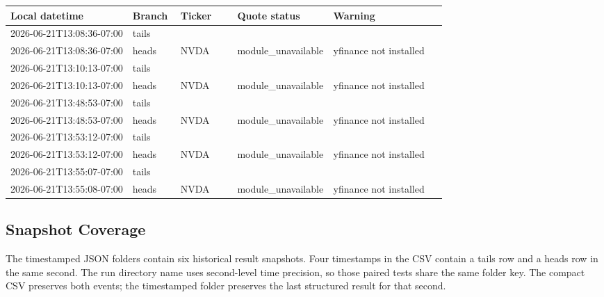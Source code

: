 \documentclass[11pt,a4paper]{article}
\newcommand{\tighttable}{\renewcommand{\arraystretch}{1.16}\small}
\begin{document}
\tighttable
\begin{tabularx}{\linewidth}{@{}p{0.28\linewidth}p{0.11\linewidth}p{0.13\linewidth}p{0.22\linewidth}X@{}}
\toprule
Local datetime & Branch & Ticker & Quote status & Warning \\
\midrule
2026-06-21T13:08:36-07:00 & tails & & & \\
2026-06-21T13:08:36-07:00 & heads & NVDA & module\_unavailable & yfinance not installed \\
2026-06-21T13:10:13-07:00 & tails & & & \\
2026-06-21T13:10:13-07:00 & heads & NVDA & module\_unavailable & yfinance not installed \\
2026-06-21T13:48:53-07:00 & tails & & & \\
2026-06-21T13:48:53-07:00 & heads & NVDA & module\_unavailable & yfinance not installed \\
2026-06-21T13:53:12-07:00 & tails & & & \\
2026-06-21T13:53:12-07:00 & heads & NVDA & module\_unavailable & yfinance not installed \\
2026-06-21T13:55:07-07:00 & tails & & & \\
2026-06-21T13:55:08-07:00 & heads & NVDA & module\_unavailable & yfinance not installed \\
\bottomrule
\end{tabularx}
\normalsize

\subsection{Snapshot Coverage}

The timestamped JSON folders contain six historical result snapshots. Four
timestamps in the CSV contain a tails row and a heads row in the same second.
The run directory name uses second-level time precision, so those paired tests
share the same folder key. The compact CSV preserves both events; the
timestamped folder preserves the last structured result for that second.
\end{document}
